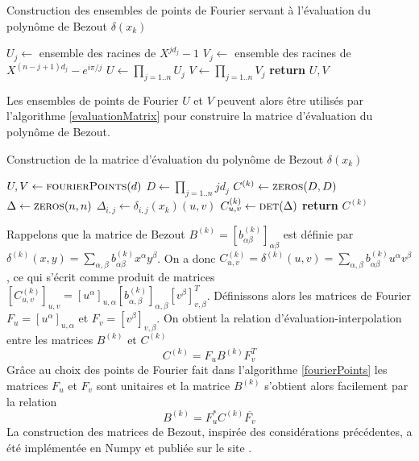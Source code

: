 \documentclass{standalone}
\begin{document}
\begin{algorithm}
\caption{Construction des ensembles de points de Fourier servant à l'évaluation du polynôme de Bezout $\delta(x_k)$}\label{fourierPoints}
\begin{algorithmic}
 
 
\State $U_j \gets$ ensemble des racines de $X^{jd_j}-1$
\State $V_j \gets$ ensemble des racines de $X^{(n-j+1)d_j}-e^{i\pi/j}$
\EndFor
\State $U \gets \prod_{j=1..n}U_j$
\State $V \gets \prod_{j=1..n}V_j$
\State \textbf{return} $U, V$
\EndFunction
\end{algorithmic}
\end{algorithm}
Les ensembles de points de Fourier $U$ et $V$ peuvent alors être utilisés par l'algorithme \ref{evaluationMatrix} pour construire la matrice d'évaluation du polynôme de Bezout.
\begin{algorithm}[H]
\caption{Construction de la matrice d'évaluation du polynôme de Bezout $\delta(x_k)$}
\label{evaluationMatrix}
\begin{algorithmic}
 
\State $U, V \gets \textsc{fourierPoints}(d)$ 
\State $D \gets \prod_{j=1..n}jd_j$
\State $C^{(k)} \gets \textsc{zeros}(D, D)$
      \State $\Delta \gets \textsc{zeros}(n, n)$
      		\State $\Delta_{i,j} \gets \delta_{i,j}(x_k)(u, v)$ 
   		\EndFor
		\State $C^{(k)}_{u, v} \gets \textsc{det}(\Delta)$
	\EndFor
\State \textbf{return} $C^{(k)}$
\EndFunction
\end{algorithmic}
\end{algorithm}
Rappelons que la matrice de Bezout $B^{(k)} = \left[b^{(k)}_{\alpha\beta}\right]_{\alpha\beta}$ est définie par $\delta^{(k)}(x, y) = \sum_{\alpha,\beta} b^{(k)}_{\alpha\beta} x^\alpha y^\beta$. On a donc $C^{(k)}_{u,v} = \delta^{(k)}(u, v) = \sum_{\alpha,\beta} b^{(k)}_{\alpha\beta} u^\alpha v^\beta$, ce qui s'écrit comme produit de matrices
$\left[C^{(k)}_{u,v}\right]_{u,v} = \left[u^\alpha\right]_{u,\alpha} \left[b^{(k)}_{\alpha,\beta}\right]_{\alpha, \beta} \left[v^\beta\right]_{v, \beta}^T$. Définissons alors les matrices de Fourier $F_u = \left[ u^\alpha \right]_{u, \alpha}$
 et $F_v = \left[ v^\beta \right]_{v, \beta}$. On obtient la relation d'évaluation-interpolation entre les matrices $B^{(k)}$ et $C^{(k)}$
$$C^{(k)} = F_uB^{(k)} F_v^T$$
 Grâce au choix des points de Fourier fait dans l'algorithme \ref{fourierPoints} les matrices $F_u$ et $F_v$ sont unitaires et la matrice $B^{(k)}$ s'obtient alors facilement par la relation
 \begin{equation}
 B^{(k)} = F_u^*C^{(k)} \overline{F_v}
 \end{equation}
La construction des matrices de Bezout, inspirée des considérations précédentes, a été implémentée en Numpy et publiée sur le site \cite{jp_code}.
\end{document}
